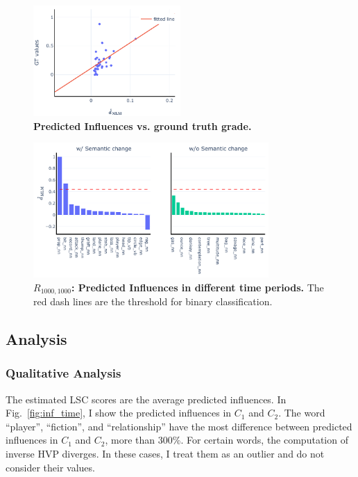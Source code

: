\begin{figure}[t]
\centering
\includegraphics[width=0.5\textwidth]{../project/src/scale_5000-recursion_depth_10000/influences_grade_scatter.pdf}
\caption{\textbf{Predicted Influences vs. ground truth grade.}}
\label{fig:rank}
\end{figure}


\begin{figure}[t]
\centering
\includegraphics[width=0.8\textwidth]{../project/src/scale_1000-recursion_depth_1000/influences_binary.pdf}
\caption{\textbf{$R_{1000, 1000}$: Predicted Influences in different time periods.} The red dash lines are the threshold for binary classification.}
\label{fig:inf_binary_r_1000_1000}
\end{figure}



\subsection{Analysis}

\subsubsection{Qualitative Analysis}
The estimated LSC scores are the average predicted influences. 
In Fig.~\ref{fig:inf_time}, I show the predicted influences in $C_1$ and $C_2$. 
The word ``player'', ``fiction'', and ``relationship'' have the most difference between predicted influences in $C_1$ and $C_2$, more than 300\%.
For certain words, the computation of inverse HVP diverges. In these cases, I treat them as an outlier and do not consider their values.


